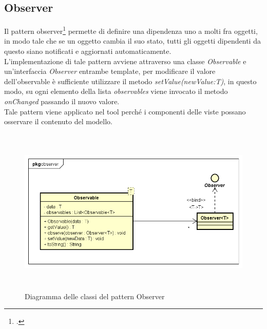 \subsection{Observer}\label{subsec:observer}
Il pattern observer\footcite{womak:decorator} permette di definire una dipendenza uno a molti fra oggetti, in modo tale che se un oggetto cambia il suo stato, tutti gli oggetti dipendenti da questo siano notificati e aggiornati automaticamente.\\
L'implementazione di tale pattern avviene attraverso una classe \textit{Observable} e un'interfaccia \textit{Observer} entrambe template, per modificare il valore dell'observable è sufficiente utilizzare il metodo \textit{setValue(newValue:T)}, in questo modo, su ogni elemento della lista \textit{observables} viene invocato il metodo \textit{onChanged} passando il nuovo valore.\\
Tale pattern viene applicato nel tool perché i componenti delle viste possano osservare il contenuto del modello.
\begin{figure}[H]
    \centering
    \includegraphics[width=14cm, height=8cm]{./immagini/diagrammi_uml/Observer.png}
    \caption{Diagramma delle classi del pattern Observer}\label{fig:observer}
\end{figure}

\newpage

